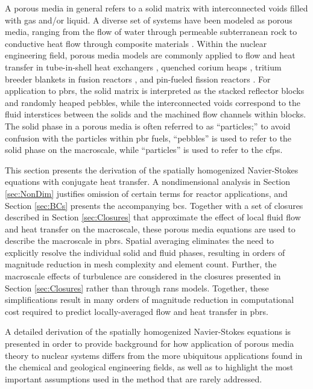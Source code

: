 A porous media in general refers to a solid matrix with interconnected voids filled with gas and/or liquid. A diverse set of systems have been modeled as porous media, ranging from the flow of water through permeable subterranean rock to conductive heat flow through composite materials \cite{diersch}. Within the nuclear engineering field, porous media models are commonly applied to flow and heat transfer in tube-in-shell heat exchangers \cite{ge_prhr}, quenched corium heaps \cite{magallon,raverdy}, tritium breeder blankets in fusion reactors \cite{xu_cfetr,zhang2016,guo2006}, and pin-fueled fission reactors \cite{zarifi}. For application to \glspl{pbr}, the solid matrix is interpreted as the stacked reflector blocks and randomly heaped pebbles, while the interconnected voids correspond to the fluid interstices between the solids and the machined flow channels within blocks. The solid phase in a porous media is often referred to as ``particles;'' to avoid confusion with the particles within \gls{pbr} fuels, ``pebbles'' is used to refer to the solid phase on the macroscale, while ``particles'' is used to refer to the \glspl{cfp}.

This section presents the derivation of the spatially homogenized Navier-Stokes equations with conjugate heat transfer. A nondimensional analysis in Section \ref{sec:NonDim} justifies omission of certain terms for reactor applications, and Section \ref{sec:BCs} presents the accompanying \glspl{bc}. Together with a set of closures described in Section \ref{sec:Closures} that approximate the effect of local fluid flow and heat transfer on the macroscale, these porous media equations are used to describe the macroscale in \glspl{pbr}. Spatial averaging eliminates the need to explicitly resolve the individual solid and fluid phases, resulting in orders of magnitude reduction in mesh complexity and element count. Further, the macroscale effects of turbulence are considered in the closures presented in Section \ref{sec:Closures} rather than through \gls{rans} models. Together, these simplifications result in many orders of magnitude reduction in computational cost required to predict locally-averaged flow and heat transfer in \glspl{pbr}.

A detailed derivation of the spatially homogenized Navier-Stokes equations is presented in order to provide background for how application of porous media theory to nuclear systems differs from the more ubiquitous applications found in the chemical and geological engineering fields, as well as to highlight the most important assumptions used in the method that are rarely addressed. 

